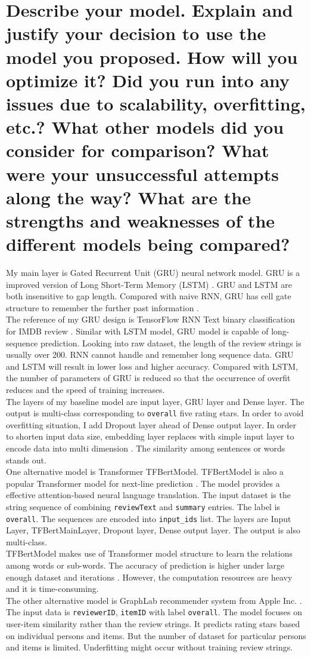 \documentclass[12pt]{article}
\begin{document}
\section{Describe your model. Explain and justify your decision to use the model you proposed. How
will you optimize it? Did you run into any issues due to scalability, overfitting, etc.? What
other models did you consider for comparison? What were your unsuccessful attempts along
the way? What are the strengths and weaknesses of the different models being compared?} 
My main layer is Gated Recurrent Unit (GRU) neural network model.
GRU is a improved version of Long Short-Term Memory (LSTM) \cite{gru}. GRU and LSTM are both insensitive 
to gap length. Compared with naive RNN, GRU has cell gate structure to remember the further past information \cite{lstm}.\\
The reference of my GRU design is
TensorFlow RNN Text binary classification for IMDB review \cite{Textclassification}. Similar with LSTM model, GRU
model is capable of long-sequence prediction. Looking into raw dataset, the length of the review strings
is usually over 200. RNN cannot handle and remember long sequence data. GRU and LSTM will result in lower loss and 
higher accuracy.
Compared with LSTM, the number of parameters of GRU is reduced so
that the occurrence of overfit reduces and the speed of training increases.\\
The layers of my baseline model are input layer, GRU layer and Dense layer. The output is multi-class corresponding to \texttt{overall} five rating stars. In order to avoid overfitting situation, I add Dropout layer ahead of Dense output layer. In order to shorten input data size, embedding layer replaces with simple input layer to encode data into
multi dimension \cite{emd}. The similarity among sentences or words stands out.\\
One alternative model is Transformer TFBertModel.
TFBertModel is also a popular Transformer model for next-line prediction \cite{BERT, trans}. 
The model provides a effective attention-based neural language translation.
The input dataset is the string
sequence of combining \texttt{reviewText} and \texttt{summary} entries. The label is \texttt{overall}. The sequences are
encoded into \texttt{input\_ids} list. The layers are Input Layer, TFBertMainLayer, Dropout layer, Dense output
layer. The output is also multi-class.\\
TFBertModel makes use of Transformer model structure to learn the relations among words or sub-words.
The accuracy of prediction is higher under large enough dataset and iterations \cite{BERTpros}. 
However, the computation resources are heavy and it is time-consuming.\\
The other alternative model is GraphLab recommender system from Apple Inc. \cite{graph}. 
The input data is \texttt{reviewerID}, \texttt{itemID} with label \texttt{overall}.
The model focuses on user-item similarity rather than the review strings. It predicts rating stars based on individual
persons and items. But the number of dataset for particular persons and items is limited. Underfitting might occur
without training review strings.
\end{document}
